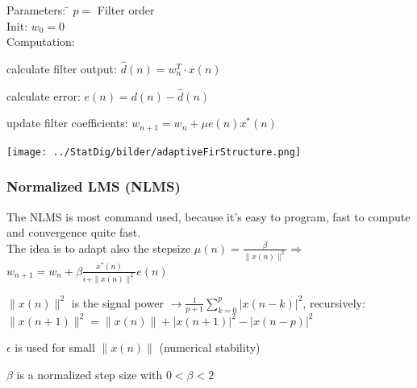 \begin{minipage}{9cm}
  \begin{tabbing}
  	Parameters:  \= $p= $ Filter order\\
  	Init:		\> $w_0= 0$\\
  	Computation:
  \end{tabbing}	
      \begin{aufzaehlung}
          \item calculate filter output: $\hat{d}(n) = w_n^T\cdot x(n)$ 
          \item calculate error: $e(n) = d(n) - \hat{d}(n)$
          \item update filter coefficients: $w_{n+1}=w_n+\mu e(n)x^*(n)$  
      \end{aufzaehlung}\vspace{0.05cm}

\end{minipage} 
\begin{minipage}{10cm}
  \texttt{[image: ../StatDig/bilder/adaptiveFirStructure.png]}
\end{minipage}

\subsubsection{Normalized LMS (NLMS) }
The NLMS is most command used, because it's easy to program, fast to compute and convergence quite fast.\\
The idea is to adapt also the stepsize $\mu(n)=\frac{\beta}{\|x(n)\|^2} \Rightarrow $
$\boxed{w_{n+1}=w_n +\beta \frac{x^*(n)}{\epsilon+\|x(n)\|^2}e(n)}$\\
\begin{liste}
	\item $\|x(n)\|^2$ is the signal power $\to \frac{1}{p+1} \sum\limits_{k=0}^{p} | x(n-k) |^2 $, recursively: $\|x(n+1)\|^2 =  \|x(n)\| + |x(n+1)|^2 -|x(n-p)|^2$
 	\item $\epsilon$ is used for small $\|x(n)\|$ (numerical stability)
	\item $\beta$ is a normalized step size with $0 < \beta < 2$
\end{liste}


